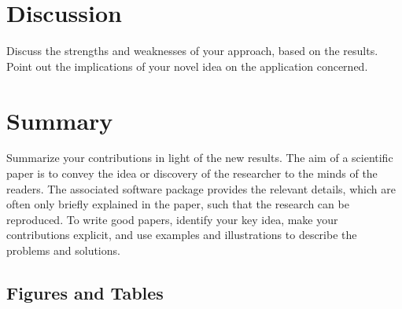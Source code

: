 \documentclass[10pt,conference,compsocconf]{IEEEtran}
\begin{document}
\section{Discussion}\label{sec: discussion}
Discuss the strengths and weaknesses of your
  approach, based on the results. Point out the implications of your
  novel idea on the application concerned.
\section{Summary}\label{sec: summary}
Summarize your contributions in light of the new
  results.
The aim of a scientific paper is to convey the idea or discovery of
the researcher to the minds of the readers. The associated software
package provides the relevant details, which are often only briefly
explained in the paper, such that the research can be reproduced.
To write good papers, identify your key idea, make your contributions
explicit, and use examples and illustrations to describe the problems
and solutions.

\subsection{Figures and Tables}
\end{document}
